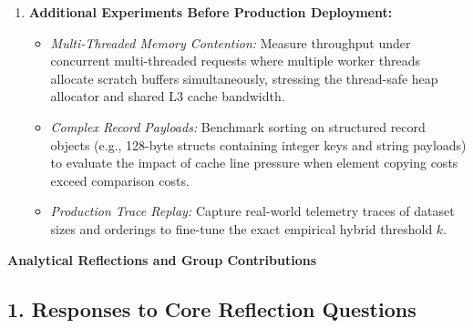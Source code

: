 \documentclass[11pt]{article}
\begin{document}
\begin{enumerate}[itemsep=0.08em, topsep=0.08em]
    \item \textbf{Additional Experiments Before Production Deployment:}
    \begin{itemize}[itemsep=0.02em, topsep=0.04em]
        \item \textit{Multi-Threaded Memory Contention:} Measure throughput under concurrent multi-threaded requests where multiple worker threads allocate scratch buffers simultaneously, stressing the thread-safe heap allocator and shared L3 cache bandwidth.
        \item \textit{Complex Record Payloads:} Benchmark sorting on structured record objects (e.g., 128-byte structs containing integer keys and string payloads) to evaluate the impact of cache line pressure when element copying costs exceed comparison costs.
        \item \textit{Production Trace Replay:} Capture real-world telemetry traces of dataset sizes and orderings to fine-tune the exact empirical hybrid threshold $k$.
    \end{itemize}
\end{enumerate}

\newpage

{\centering\fontsize{15}{18}\selectfont\textbf{Analytical Reflections and Group Contributions}\par}
\vspace{0.6em}

\subsection*{1. Responses to Core Reflection Questions}
\end{document}

